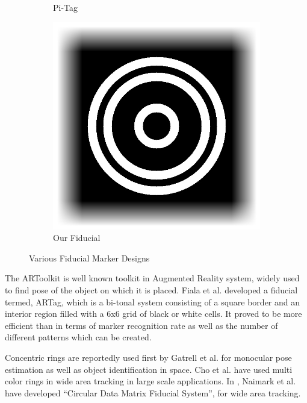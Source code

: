 \documentclass[runningheads]{llncs}
\begin{document}
\begin{figure}
\begin{subfigure}[b]{0.19\textwidth}
  Pi-Tag\cite{Pitag13}
 \end{subfigure}
 \begin{subfigure}[b]{0.19\textwidth}
  \centering
  \includegraphics[width=\linewidth]{our_fiducial}
  Our Fiducial
 \end{subfigure}
 \caption{Various Fiducial Marker Designs}
 \label{fig:previous_work}
\end{figure}

The ARToolkit \cite{ARToolkit02} \cite{kato-artoolkit} is well known toolkit in
Augmented Reality system, widely used to find pose of the object on which it is
placed.  Fiala et al. \cite{Fiala05} developed a fiducial termed, ARTag, which is a
bi-tonal system consisting of a square border and
an interior region filled with a 6x6 grid of black or white cells. It proved to
be more efficient than \cite{ARToolkit02} in terms of marker recognition rate
as well as the number of different patterns which can be created.

Concentric rings are reportedly used first by Gatrell et al.\cite{concentric}
for monocular pose estimation as well as object identification in space. Cho et al.
\cite{Cho:2001}\cite{Cho97fastcolor} have used multi color rings in wide area
tracking in large scale applications. In \cite{NaimarkF02}, Naimark et al.
have developed ``Circular Data Matrix Fiducial System'', for wide area tracking.
\end{document}
